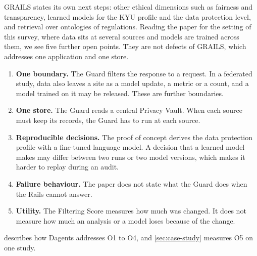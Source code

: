 GRAILS states its own next steps: other ethical dimensions such as fairness and
transparency, learned models for the KYU profile and the data protection level,
and retrieval over ontologies of regulations. Reading the paper for the setting
of this survey, where data sits at several sources and models are trained
across them, we see five further open points. They are not defects of GRAILS,
which addresses one application and one store.
\begin{enumerate}[label=O\arabic*.]
  \item \textbf{One boundary.} The Guard filters the response to a request. In
        a federated study, data also leaves a site as a model update, a metric
        or a count, and a model trained on it may be released. These are
        further boundaries.
  \item \textbf{One store.} The Guard reads a central Privacy Vault. When each
        source must keep its records, the Guard has to run at each source.
  \item \textbf{Reproducible decisions.} The proof of concept derives the data
        protection profile with a fine-tuned language model. A decision that a
        learned model makes may differ between two runs or two model versions,
        which makes it harder to replay during an audit.
  \item \textbf{Failure behaviour.} The paper does not state what the Guard does
        when the Rails cannot answer.
  \item \textbf{Utility.} The Filtering Score measures how much was changed. It
        does not measure how much an analysis or a model loses because of the
        change.
\end{enumerate}
 describes how Dagents addresses O1 to O4, and
\cref{sec:case-study} measures O5 on one study.
